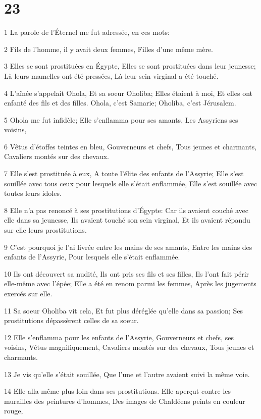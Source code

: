 \chapter{23}

\par 1 La parole de l'Éternel me fut adressée, en ces mots:
\par 2 Fils de l'homme, il y avait deux femmes, Filles d'une même mère.
\par 3 Elles se sont prostituées en Égypte, Elles se sont prostituées dans leur jeunesse; Là leurs mamelles ont été pressées, Là leur sein virginal a été touché.
\par 4 L'aînée s'appelait Ohola, Et sa soeur Oholiba; Elles étaient à moi, Et elles ont enfanté des fils et des filles. Ohola, c'est Samarie; Oholiba, c'est Jérusalem.
\par 5 Ohola me fut infidèle; Elle s'enflamma pour ses amants, Les Assyriens ses voisins,
\par 6 Vêtus d'étoffes teintes en bleu, Gouverneurs et chefs, Tous jeunes et charmants, Cavaliers montés sur des chevaux.
\par 7 Elle s'est prostituée à eux, A toute l'élite des enfants de l'Assyrie; Elle s'est souillée avec tous ceux pour lesquels elle s'était enflammée, Elle s'est souillée avec toutes leurs idoles.
\par 8 Elle n'a pas renoncé à ses prostitutions d'Égypte: Car ils avaient couché avec elle dans sa jeunesse, Ils avaient touché son sein virginal, Et ils avaient répandu sur elle leurs prostitutions.
\par 9 C'est pourquoi je l'ai livrée entre les mains de ses amants, Entre les mains des enfants de l'Assyrie, Pour lesquels elle s'était enflammée.
\par 10 Ils ont découvert sa nudité, Ils ont pris ses fils et ses filles, Ils l'ont fait périr elle-même avec l'épée; Elle a été en renom parmi les femmes, Après les jugements exercés sur elle.
\par 11 Sa soeur Oholiba vit cela, Et fut plus déréglée qu'elle dans sa passion; Ses prostitutions dépassèrent celles de sa soeur.
\par 12 Elle s'enflamma pour les enfants de l'Assyrie, Gouverneurs et chefs, ses voisins, Vêtus magnifiquement, Cavaliers montés sur des chevaux, Tous jeunes et charmants.
\par 13 Je vis qu'elle s'était souillée, Que l'une et l'autre avaient suivi la même voie.
\par 14 Elle alla même plus loin dans ses prostitutions. Elle aperçut contre les murailles des peintures d'hommes, Des images de Chaldéens peints en couleur rouge,

